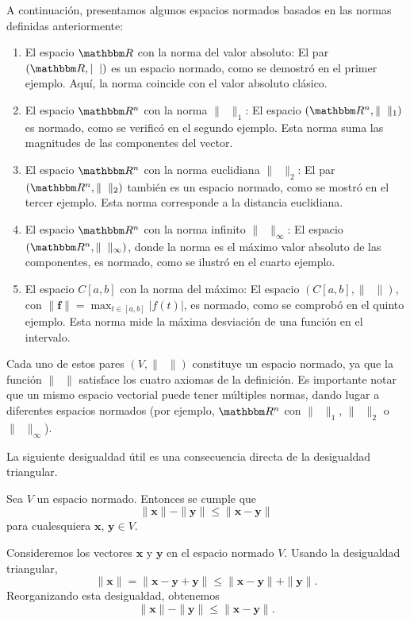 \begin{examplebox}{}{}
    A continuación, presentamos algunos espacios normados basados en las normas definidas anteriormente:
    \begin{enumerate}[label=\roman*), topsep=6pt, itemsep=0pt]
        \item El espacio $\RR$ con la norma del valor absoluto: El par $(\RR, |\phantom{x}|)$ es un espacio normado, como se demostró en el primer ejemplo. Aquí, la norma coincide con el valor absoluto clásico.
        \item El espacio $\RR[n]$ con la norma $\| \phantom{x} \|_1$: El espacio $(\RR[n], \| \phantom{x} \|_1)$ es normado, como se verificó en el segundo ejemplo. Esta norma suma las magnitudes de las componentes del vector.
        \item El espacio $\RR[n]$ con la norma euclidiana $\| \phantom{x} \|_2$: El par $(\RR[n], \| \phantom{x} \|_2)$ también es un espacio normado, como se mostró en el tercer ejemplo. Esta norma corresponde a la distancia euclidiana.
        \item El espacio $\RR[n]$ con la norma infinito $\| \phantom{x} \|_\infty$: El espacio $(\RR[n], \| \phantom{x} \|_\infty)$, donde la norma es el máximo valor absoluto de las componentes, es normado, como se ilustró en el cuarto ejemplo.
        \item El espacio $C[a, b]$ con la norma del máximo: El espacio $(C[a, b], \| \phantom{x} \|)$, con $\displaystyle \|\mathbf{f}\| = \max_{t \in [a,b]} |f(t)|$, es normado, como se comprobó en el quinto ejemplo. Esta norma mide la máxima desviación de una función en el intervalo.
    \end{enumerate}
    Cada uno de estos pares $(V, \| \phantom{x} \|)$ constituye un espacio normado, ya que la función $\| \phantom{x} \|$ satisface los cuatro axiomas de la definición. Es importante notar que un mismo espacio vectorial puede tener múltiples normas, dando lugar a diferentes espacios normados (por ejemplo, $\RR[n]$ con $\| \phantom{x} \|_1$, $\| \phantom{x} \|_2$ o $\| \phantom{x} \|_\infty$).
\end{examplebox}

La siguiente desigualdad útil es una consecuencia directa de la desigualdad triangular.

\begin{theorem}{}{}
    Sea $V$ un espacio normado. Entonces se cumple que
    $$\| \mathbf{x} \| - \| \mathbf{y} \| \leq \| \mathbf{x} - \mathbf{y} \|$$
    para cualesquiera $\mathbf{x}$, $\mathbf{y} \in V$.

    \tcblower
    \demostracion Consideremos los vectores $\mathbf{x}$ y $\mathbf{y}$ en el espacio normado $V$. Usando la desigualdad triangular,
    $$\| \mathbf{x} \| = \| \mathbf{x} - \mathbf{y} + \mathbf{y} \| \leq \| \mathbf{x} - \mathbf{y} \| + \| \mathbf{y} \|.$$
    Reorganizando esta desigualdad, obtenemos
    $$\| \mathbf{x} \| - \| \mathbf{y} \| \leq \| \mathbf{x} - \mathbf{y} \|.$$
\end{theorem}

